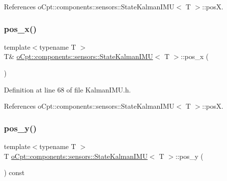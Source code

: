 References o\+Cpt\+::components\+::sensors\+::\+State\+Kalman\+I\+M\+U$<$ T $>$\+::posX.

\hypertarget{classo_cpt_1_1components_1_1sensors_1_1_state_kalman_i_m_u_add96951f74a6f0b172b1d28d410733e4}{}\label{classo_cpt_1_1components_1_1sensors_1_1_state_kalman_i_m_u_add96951f74a6f0b172b1d28d410733e4} 
\subsubsection{\texorpdfstring{pos\+\_\+x()}{pos\_x()}\hspace{0.1cm}{\footnotesize\ttfamily [2/2]}}
{\footnotesize\ttfamily template$<$typename T $>$ \\
T\& \hyperlink{classo_cpt_1_1components_1_1sensors_1_1_state_kalman_i_m_u}{o\+Cpt\+::components\+::sensors\+::\+State\+Kalman\+I\+MU}$<$ T $>$\+::pos\+\_\+x (\begin{DoxyParamCaption}{ }\end{DoxyParamCaption})\hspace{0.3cm}{\ttfamily [inline]}}



Definition at line 68 of file Kalman\+I\+M\+U.\+h.



References o\+Cpt\+::components\+::sensors\+::\+State\+Kalman\+I\+M\+U$<$ T $>$\+::posX.

\hypertarget{classo_cpt_1_1components_1_1sensors_1_1_state_kalman_i_m_u_aadf3572aedab8c11db304bed654cf2b7}{}\label{classo_cpt_1_1components_1_1sensors_1_1_state_kalman_i_m_u_aadf3572aedab8c11db304bed654cf2b7} 
\subsubsection{\texorpdfstring{pos\+\_\+y()}{pos\_y()}\hspace{0.1cm}{\footnotesize\ttfamily [1/2]}}
{\footnotesize\ttfamily template$<$typename T $>$ \\
T \hyperlink{classo_cpt_1_1components_1_1sensors_1_1_state_kalman_i_m_u}{o\+Cpt\+::components\+::sensors\+::\+State\+Kalman\+I\+MU}$<$ T $>$\+::pos\+\_\+y (\begin{DoxyParamCaption}{ }\end{DoxyParamCaption}) const\hspace{0.3cm}{\ttfamily [inline]}}



